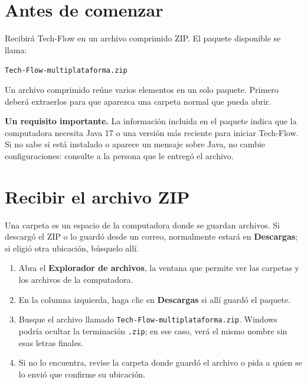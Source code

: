 \documentclass[12pt,a4paper]{article}
\begin{document}
\tableofcontents\listoffigures\newpage

\section{Antes de comenzar}
Recibirá Tech-Flow en un archivo comprimido ZIP. El paquete disponible se llama:
\begin{center}\texttt{Tech-Flow-multiplataforma.zip}\end{center}
Un archivo comprimido reúne varios elementos en un solo paquete. Primero deberá extraerlos para que aparezca una carpeta normal que pueda abrir.

\begin{techbox}\textbf{Un requisito importante.} La información incluida en el paquete indica que la computadora necesita Java 17 o una versión más reciente para iniciar Tech-Flow. Si no sabe si está instalado o aparece un mensaje sobre Java, no cambie configuraciones: consulte a la persona que le entregó el archivo.\end{techbox}

\section{Recibir el archivo ZIP}
Una carpeta es un espacio de la computadora donde se guardan archivos. Si descargó el ZIP o lo guardó desde un correo, normalmente estará en \textbf{Descargas}; si eligió otra ubicación, búsquelo allí.
\begin{enumerate}
\item Abra el \textbf{Explorador de archivos}, la ventana que permite ver las carpetas y los archivos de la computadora.
\item En la columna izquierda, haga clic en \textbf{Descargas} si allí guardó el paquete.
\item Busque el archivo llamado \texttt{Tech-Flow-multiplataforma.zip}. Windows podría ocultar la terminación \texttt{.zip}; en ese caso, verá el mismo nombre sin esas letras finales.
\item Si no lo encuentra, revise la carpeta donde guardó el archivo o pida a quien se lo envió que confirme su ubicación.
\end{enumerate}
\end{document}
